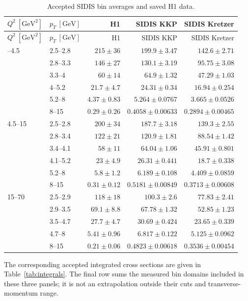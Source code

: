 \documentclass[11pt,a4paper]{article}
\newcommand{\GeV}{\mathrm{GeV}}
\begin{document}
\begingroup
\small
\setlength{\tabcolsep}{4pt}
\begin{longtable}{@{}llrrr@{}}
\caption{Accepted SIDIS bin averages and saved H1 data.\label{tab:bins}}\\
\toprule
$Q^2\ [\GeV^2]$ & $p_T\ [\GeV]$ & H1 & SIDIS KKP & SIDIS Kretzer\\
\midrule
\endfirsthead
\toprule
$Q^2\ [\GeV^2]$ & $p_T\ [\GeV]$ & H1 & SIDIS KKP & SIDIS Kretzer\\
\midrule
\endhead
\bottomrule
\endfoot
2--4.5 & 2.5--2.8 & $215\pm 36$ & $199.9\pm 3.47$ & $142.6\pm 2.71$\\
 & 2.8--3.3 & $146\pm 27$ & $130.1\pm 3.19$ & $95.75\pm 3.08$\\
 & 3.3--4 & $60\pm 14$ & $64.9\pm 1.32$ & $47.29\pm 1.03$\\
 & 4--5.2 & $21.7\pm 4.7$ & $24.31\pm 0.34$ & $16.94\pm 0.254$\\
 & 5.2--8 & $4.37\pm 0.83$ & $5.264\pm 0.0767$ & $3.665\pm 0.0526$\\
 & 8--15 & $0.29\pm 0.26$ & $0.4058\pm 0.00633$ & $0.2894\pm 0.00465$\\
\midrule
4.5--15 & 2.5--2.8 & $200\pm 34$ & $187.7\pm 3.18$ & $139.3\pm 2.55$\\
 & 2.8--3.4 & $122\pm 21$ & $120.9\pm 1.81$ & $88.54\pm 1.42$\\
 & 3.4--4.1 & $58\pm 11$ & $64.04\pm 1.06$ & $45.91\pm 0.801$\\
 & 4.1--5.2 & $23\pm 4.9$ & $26.31\pm 0.441$ & $18.7\pm 0.338$\\
 & 5.2--8 & $5.8\pm 1.2$ & $6.189\pm 0.108$ & $4.409\pm 0.0859$\\
 & 8--15 & $0.31\pm 0.12$ & $0.5181\pm 0.00849$ & $0.3713\pm 0.00608$\\
\midrule
15--70 & 2.5--2.9 & $118\pm 18$ & $100.3\pm 2.6$ & $77.83\pm 2.41$\\
 & 2.9--3.5 & $69.1\pm 8.8$ & $67.78\pm 1.32$ & $52.85\pm 1.23$\\
 & 3.5--4.7 & $27.7\pm 4.7$ & $30.69\pm 0.424$ & $23.65\pm 0.339$\\
 & 4.7--8 & $5.41\pm 0.96$ & $6.817\pm 0.122$ & $5.125\pm 0.0962$\\
 & 8--15 & $0.21\pm 0.06$ & $0.4823\pm 0.00618$ & $0.3536\pm 0.00454$\\
\end{longtable}
\endgroup

The corresponding accepted integrated cross sections are given in
Table~\ref{tab:integrals}. The final row sums the measured bin domains
included in these three panels; it is not an extrapolation outside
their cuts and transverse-momentum range.
\end{document}
